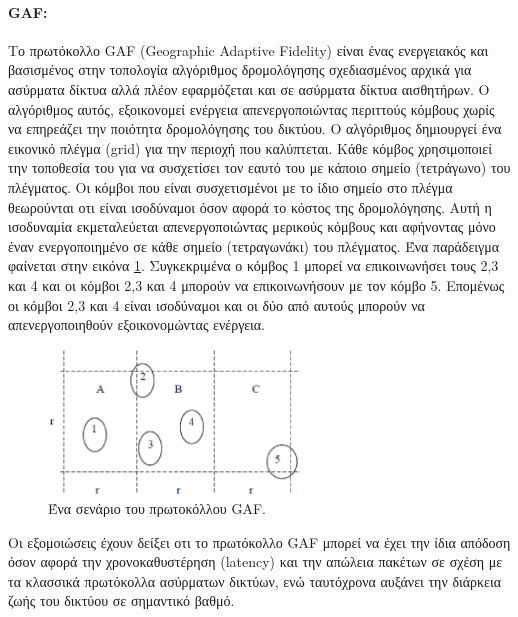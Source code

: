 \paragraph{GAF:} Το πρωτόκολλο GAF (Geographic Adaptive Fidelity) \cite{gaf_protocol} είναι ένας ενεργειακός και βασισμένος στην τοπολογία αλγόριθμος δρομολόγησης
σχεδιασμένος αρχικά για ασύρματα δίκτυα αλλά πλέον εφαρμόζεται και σε ασύρματα δίκτυα αισθητήρων. Ο αλγόριθμος αυτός, εξοικονομεί ενέργεια απενεργοποιώντας περιττούς
κόμβους χωρίς να επηρεάζει την ποιότητα δρομολόγησης του δικτύου. Ο αλγόριθμος δημιουργεί ένα εικονικό πλέγμα (grid) για την περιοχή που καλύπτεται. Κάθε κόμβος
χρησιμοποιεί την τοποθεσία του για να συσχετίσει τον εαυτό του με κάποιο σημείο (τετράγωνο) του πλέγματος. Οι κόμβοι που είναι συσχετισμένοι με το ίδιο σημείο στο
πλέγμα θεωρούνται οτι είναι ισοδύναμοι όσον αφορά το κόστος της δρομολόγησης. Αυτή η ισοδυναμία εκμεταλεύεται απενεργοποιώντας μερικούς κόμβους και αφήνοντας μόνο
έναν ενεργοποιημένο σε κάθε σημείο (τετραγωνάκι) του πλέγματος. Ένα παράδειγμα φαίνεται στην εικόνα \ref{fig:gaf_example}. Συγκεκριμένα ο κόμβος 1 μπορεί να
επικοινωνήσει τους 2,3 και 4 και οι κόμβοι 2,3 και 4 μπορούν να επικοινωνήσουν με τον κόμβο 5. Επομένως οι κόμβοι 2,3 και 4 είναι ισοδύναμοι και οι δύο από αυτούς
μπορούν να απενεργοποιηθούν εξοικονομώντας ενέργεια.

\begin{figure}[h]
	\centering
	\includegraphics[width=0.6\textwidth]{images/gaf_example.eps}
	\caption{Ένα σενάριο του πρωτοκόλλου GAF.}
	\label{fig:gaf_example}
\end{figure}

Οι εξομοιώσεις έχουν δείξει οτι το πρωτόκολλο GAF μπορεί να έχει την ίδια απόδοση όσον αφορά την χρονοκαθυστέρηση (latency) και την απώλεια πακέτων σε σχέση με τα
κλασσικά πρωτόκολλα ασύρματων δικτύων, ενώ ταυτόχρονα αυξάνει την διάρκεια ζωής του δικτύου σε σημαντικό βαθμό.

